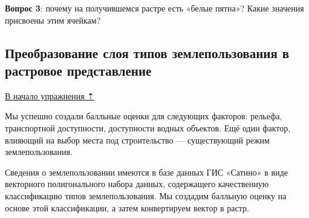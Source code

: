 \documentclass[
  12pt,
]{book}
\begin{document}
\textbf{Вопрос 3}: почему на получившемся растре есть «белые пятна»? Какие значения присвоены этим ячейкам?

\hypertarget{ux43fux440ux435ux43eux431ux440ux430ux437ux43eux432ux430ux43dux438ux435-ux441ux43bux43eux44f-ux442ux438ux43fux43eux432-ux437ux435ux43cux43bux435ux43fux43eux43bux44cux437ux43eux432ux430ux43dux438ux44f-ux432-ux440ux430ux441ux442ux440ux43eux432ux43eux435-ux43fux440ux435ux434ux441ux442ux430ux432ux43bux435ux43dux438ux435}{%
\subsection{Преобразование слоя типов землепользования в растровое представление}\label{ux43fux440ux435ux43eux431ux440ux430ux437ux43eux432ux430ux43dux438ux435-ux441ux43bux43eux44f-ux442ux438ux43fux43eux432-ux437ux435ux43cux43bux435ux43fux43eux43bux44cux437ux43eux432ux430ux43dux438ux44f-ux432-ux440ux430ux441ux442ux440ux43eux432ux43eux435-ux43fux440ux435ux434ux441ux442ux430ux432ux43bux435ux43dux438ux435}}

\protect\hyperlink{weighted-overlay}{В начало упражнения ⇡}

Мы успешно создали балльные оценки для следующих факторов: рельефа, транспортной доступности, доступности водных объектов. Ещё один фактор, влияющий на выбор места под строительство --- существующий режим землепользования.

Сведения о землепользовании имеются в базе данных ГИС «Сатино» в виде векторного полигонального набора данных, содержащего качественную классификацию типов землепользования. Мы создадим балльную оценку на основе этой классификации, а затем конвертируем вектор в растр.
\end{document}
